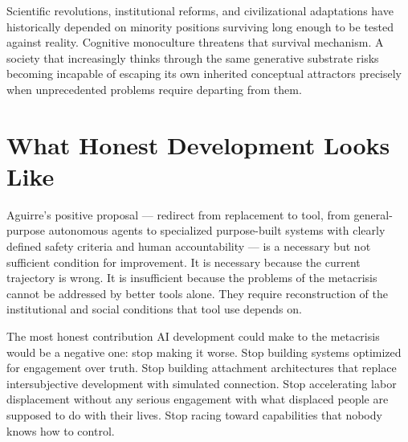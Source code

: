 \documentclass[12pt, a4paper]{article}
\theoremstyle{remark}
\begin{document}
Scientific revolutions, institutional reforms, and civilizational adaptations have historically depended on minority positions surviving long enough to be tested against reality. Cognitive monoculture threatens that survival mechanism. A society that increasingly thinks through the same generative substrate risks becoming incapable of escaping its own inherited conceptual attractors precisely when unprecedented problems require departing from them.

\begin{center}
\end{center}

\section{What Honest Development Looks Like}

Aguirre's positive proposal --- redirect from replacement to tool, from general-purpose autonomous agents to specialized purpose-built systems with clearly defined safety criteria and human accountability --- is a necessary but not sufficient condition for improvement. It is necessary because the current trajectory is wrong. It is insufficient because the problems of the metacrisis cannot be addressed by better tools alone. They require reconstruction of the institutional and social conditions that tool use depends on.

The most honest contribution AI development could make to the metacrisis would be a negative one: stop making it worse. Stop building systems optimized for engagement over truth. Stop building attachment architectures that replace intersubjective development with simulated connection. Stop accelerating labor displacement without any serious engagement with what displaced people are supposed to do with their lives. Stop racing toward capabilities that nobody knows how to control.
\end{document}
